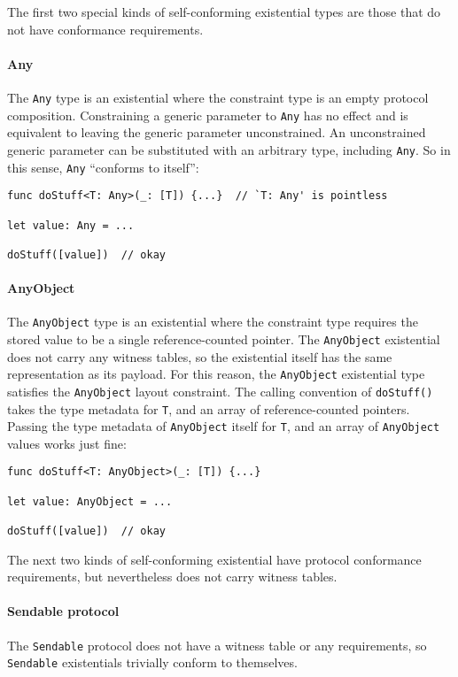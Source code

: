 \documentclass[a4paper,headsepline,bibliography=totoc,toc=flat,fleqn,twoside=semi]{scrbook}
\theoremstyle{definition}
\theoremstyle{definition}
\theoremstyle{definition}
\begin{document}
The first two special kinds of self-conforming existential types are those that do not have conformance requirements.

\paragraph{Any} The \texttt{Any} type is an existential where the constraint type is an empty protocol composition. Constraining a generic parameter to \texttt{Any} has no effect and is equivalent to leaving the generic parameter unconstrained. An unconstrained generic parameter can be substituted with an arbitrary type, including \texttt{Any}. So in this sense, \texttt{Any} ``conforms to itself'':
\begin{Verbatim}
func doStuff<T: Any>(_: [T]) {...}  // `T: Any' is pointless

let value: Any = ...

doStuff([value])  // okay
\end{Verbatim}

\paragraph{AnyObject} The \texttt{AnyObject} type is an existential where the constraint type requires the stored value to be a single reference-counted pointer. The \texttt{AnyObject} existential does not carry any witness tables, so the existential itself has the same representation as its payload. For this reason, the \texttt{AnyObject} existential type satisfies the \texttt{AnyObject} layout constraint. The calling convention of \texttt{doStuff()} takes the type metadata for \texttt{T}, and an array of reference-counted pointers. Passing the type metadata of \texttt{AnyObject} itself for \texttt{T}, and an array of \texttt{AnyObject} values works just fine:
\begin{Verbatim}
func doStuff<T: AnyObject>(_: [T]) {...}

let value: AnyObject = ...

doStuff([value])  // okay
\end{Verbatim}

The next two kinds of self-conforming existential have protocol conformance requirements, but nevertheless does not carry witness tables.

\paragraph{Sendable protocol} The \texttt{Sendable} protocol does not have a witness table or any requirements, so \texttt{Sendable} existentials trivially conform to themselves.
\end{document}
